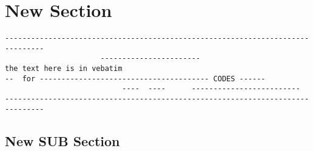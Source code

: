 \documentclass[ms,a4paper]{memoir}
\begin{document}
\section{New Section}
\lipsum[1] \lipsum[1] \lipsum[1] \lipsum[1]


\clearpage

\onecolumn
\begin{verbatim}
-------------------------------------------------------------------------------
                      -----------------------
the text here is in vebatim 
--  for --------------------------------------- CODES ------
                           ----  ----      -------------------------
-------------------------------------------------------------------------------
\end{verbatim}
\twocolumn

\subsection{New SUB Section}
\lipsum[1] \lipsum[1] \lipsum[1] \lipsum[1]

\end{document}
